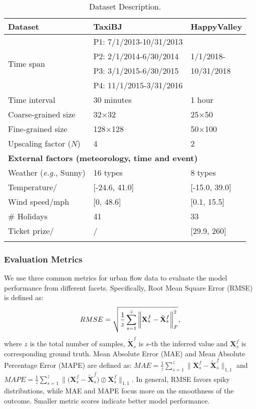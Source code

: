 \begin{table}[!h]
	\centering
	\caption{Dataset Description.}
	\vspace{-0.8em}
	\tabcolsep=1.2mm
	  \begin{tabular}{lll}
	  \shline
	  \textbf{Dataset} & \textbf{TaxiBJ} & \textbf{HappyValley} \\
	  \hline
	  \multirow{4}[1]{*}{Time span} & P1: 7/1/2013-10/31/2013 &  \\
			& P2: 2/1/2014-6/30/2014 & 1/1/2018- \\
			& P3: 3/1/2015-6/30/2015 & 10/31/2018 \\
			& P4: 11/1/2015-3/31/2016 &  \\
	  \midrule
	  Time interval & 30 minutes & 1 hour \\
	  Coarse-grained size & 32$\times$32 & 25$\times$50 \\
	  Fine-grained size & 128$\times$128 & 50$\times$100 \\
	  Upscaling factor ($N$) & 4     & 2 \\
	  \midrule
	  \multicolumn{3}{l}{\textbf{External factors (meteorology, time and event)}} \\
	  Weather (\emph{e.g.}, Sunny) & 16 types & 8 types \\
	  Temperature/\textcelsius & [-24.6, 41.0] & [-15.0, 39.0] \\
	  Wind speed/mph & [0, 48.6] & [0.1, 15.5] \\
	  \# Holidays & 41    & 33 \\
	  Ticket prize/\textyen  & /     & [29.9, 260] \\
	  \shline
	  \end{tabular}\label{tab:dataset}\end{table}



\subsubsection{Evaluation Metrics}

We use three common metrics for urban flow data to evaluate the model performance from different facets. Specifically, Root Mean Square Error (RMSE) is defined as:
\begin{equation*}
\small
	RMSE = \sqrt{\frac{1}{z}\sum_{s=1}^{z}{\bigg\lVert \mathbf{X}^f_s-\tilde{\mathbf{X}}^f_s} \bigg\rVert^2_F},
\end{equation*} 
where $z$ is the total number of samples, $\tilde{\mathbf{X}}^f_s$ is $s$-th the inferred value and $\mathbf{X}^f_s$ is corresponding ground truth. Mean Absolute Error (MAE) and Mean Absolute Percentage Error (MAPE) are defined as: $MAE = \frac{1}{z}\sum_{s=1}^{z}{\lVert{\mathbf{X}^f_s-\tilde{\mathbf{X}}^f_s}}\rVert_{1,1}$ and $MAPE = \frac{1}{z}\sum_{s=1}^{z}{\lVert{(\mathbf{X}^f_s-\tilde{\mathbf{X}}^f_s}) \oslash \mathbf{X}^f_s} \rVert_{1,1}$. In general, RMSE favors spiky distributions, while MAE and MAPE focus more on the smoothness of the outcome. Smaller metric scores indicate better model performance.

